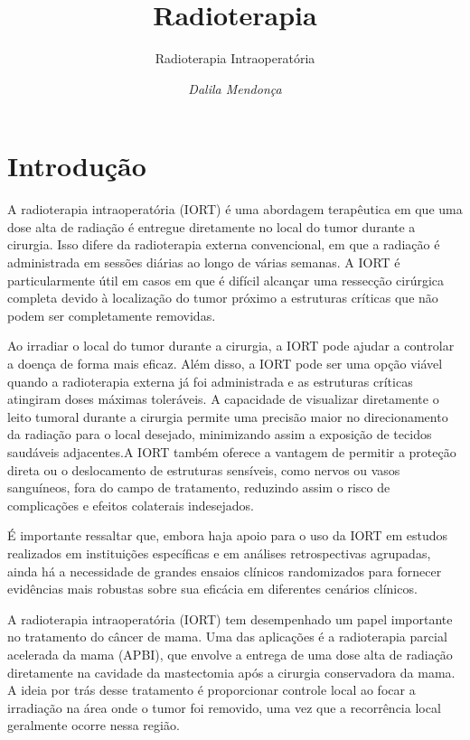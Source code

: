 \documentclass[11pt,a4paper]{article}
\title{\LobsterTwo\Huge{Radioterapia}}
\author{\LobsterTwo\Large{Radioterapia Intraoperatória}\nocite{*}}
\date{\LobsterTwo\textit{Dalila Mendonça}}
\begin{document}
	\maketitle

\section{Introdução}

	A radioterapia intraoperatória (IORT) é uma abordagem terapêutica em que uma dose alta de radiação é entregue diretamente no local do tumor durante a cirurgia. Isso difere da radioterapia externa convencional, em que a radiação é administrada em sessões diárias ao longo de várias semanas. A IORT é particularmente útil em casos em que é difícil alcançar uma ressecção cirúrgica completa devido à localização do tumor próximo a estruturas críticas que não podem ser completamente removidas.

	Ao irradiar o local do tumor durante a cirurgia, a IORT pode ajudar a controlar a doença de forma mais eficaz. Além disso, a IORT pode ser uma opção viável quando a radioterapia externa já foi administrada e as estruturas críticas atingiram doses máximas toleráveis. A capacidade de visualizar diretamente o leito tumoral durante a cirurgia permite uma precisão maior no direcionamento da radiação para o local desejado, minimizando assim a exposição de tecidos saudáveis adjacentes.A IORT também oferece a vantagem de permitir a proteção direta ou o deslocamento de estruturas sensíveis, como nervos ou vasos sanguíneos, fora do campo de tratamento, reduzindo assim o risco de complicações e efeitos colaterais indesejados.

	É importante ressaltar que, embora haja apoio para o uso da IORT em estudos realizados em instituições específicas e em análises retrospectivas agrupadas, ainda há a necessidade de grandes ensaios clínicos randomizados para fornecer evidências mais robustas sobre sua eficácia em diferentes cenários clínicos.

	A radioterapia intraoperatória (IORT) tem desempenhado um papel importante no tratamento do câncer de mama. Uma das aplicações é a radioterapia parcial acelerada da mama (APBI), que envolve a entrega de uma dose alta de radiação diretamente na cavidade da mastectomia após a cirurgia conservadora da mama. A ideia por trás desse tratamento é proporcionar controle local ao focar a irradiação na área onde o tumor foi removido, uma vez que a recorrência local geralmente ocorre nessa região.
\end{document}
